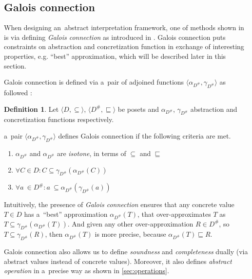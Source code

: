 \documentclass[12pt,oneside]{fithesis2}
\theoremstyle{definition}
\newtheorem{definition}{Definition}
\begin{document}
\subsection{Galois connection}

When designing an~abstract interpretation framework, one of methods shown in \cite{CousotCousot92-2} is via defining \textit{Galois connection} as introduced in \cite{CousotCousot76-1}. Galois connection puts constraints on abstraction and concretization function in exchange of interesting properties, e.g. ``best'' approximation, which will be described later in this section.

Galois connection is defined via a~pair of adjoined functions $\langle \alpha_{D^\#}, \gamma_{D^\#} \rangle$ as followed \cite{CousotCousot79-1}:

\begin{definition}
  Let $\langle D, \subseteq \rangle$, $\langle D^\#, \sqsubseteq \rangle$ be posets and $\alpha_{D^\#}$, $\gamma_{D^\#}$ abstraction and concretization functions respectively.

  a~pair $\langle \alpha_{D^\#}, \gamma_{D^\#} \rangle$ defines Galois connection if the following criteria are met.
  \begin{enumerate}
    \item $\alpha_{D^\#}$ and $\alpha_{D^\#}$ are \textit{isotone}, in terms of $\subseteq$ and $\sqsubseteq$
    \item $\forall C \in D: C \subseteq \gamma_{D^\#}(\alpha_{D^\#}(C))$
    \item $\forall a~\in D^\#: a~\subseteq \alpha_{D^\#}(\gamma_{D^\#}(a))$
  \end{enumerate}
\end{definition}

Intuitively, the presence of \textit{Galois connection} ensures that any concrete value $T \in D$ has a~``best'' approximation $\alpha_{D^\#}(T)$, that over-approximates $T$ as $T \subseteq \gamma_{D^\#}(\alpha_{D^\#}(T))$. And given any other over-approximation $R \in D^\#$, so $T \subseteq \gamma_{D^\#}(R)$, then $\alpha_{D^\#}(T)$ is more precise, because $\alpha_{D^\#}(T) \sqsubseteq R$.


Galois connection also allows us to define \textit{soundness} and \textit{completeness} dually (via abstract values instead of concrete values). Moreover, it also defines \textit{abstract operation} in a~precise way as shown in \ref{sec:operations}.
\end{document}
